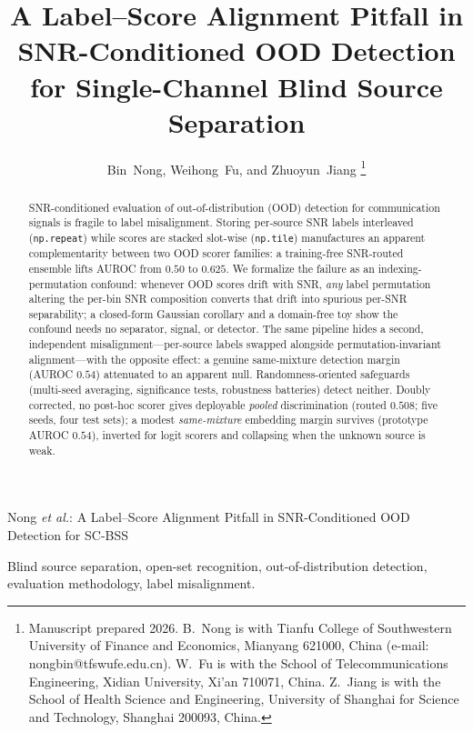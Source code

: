 \documentclass[journal,letterpaper]{IEEEtran}
\begin{document}
\title{A Label--Score Alignment Pitfall in SNR-Conditioned OOD
Detection for Single-Channel Blind Source Separation}

\author{Bin~Nong, Weihong~Fu, and Zhuoyun~Jiang%
\thanks{Manuscript prepared 2026. B.~Nong is with Tianfu College of
Southwestern University of Finance and Economics, Mianyang 621000, China
(e-mail: nongbin@tfswufe.edu.cn). W.~Fu is with the School of
Telecommunications Engineering, Xidian University, Xi'an 710071, China.
Z.~Jiang is with the School of Health Science and Engineering,
University of Shanghai for Science and Technology, Shanghai 200093,
China.}}

%
{Nong \MakeLowercase{\textit{et al.}}: A Label--Score Alignment
Pitfall in SNR-Conditioned OOD Detection for SC-BSS}

\maketitle

\begin{abstract}
SNR-conditioned evaluation of out-of-distribution (OOD) detection for
communication signals is fragile to label misalignment. Storing
per-source SNR labels interleaved (\texttt{np.repeat}) while scores are
stacked slot-wise (\texttt{np.tile}) manufactures an apparent
complementarity between two OOD scorer families: a training-free
SNR-routed ensemble lifts AUROC from $0.50$ to $0.625$. We formalize
the failure as an indexing-permutation confound: whenever OOD scores
drift with SNR, \emph{any} label permutation altering the per-bin SNR
composition converts that drift into spurious per-SNR separability; a
closed-form Gaussian corollary and a domain-free toy show the confound
needs no separator, signal, or detector. The same pipeline hides a
second, independent misalignment---per-source labels swapped alongside
permutation-invariant alignment---with the opposite effect: a genuine
same-mixture detection margin (AUROC $0.54$) attenuated to an apparent
null. Randomness-oriented safeguards (multi-seed averaging,
significance tests, robustness batteries) detect neither. Doubly
corrected, no post-hoc scorer gives deployable \emph{pooled}
discrimination (routed $0.508$; five seeds, four test sets); a modest
\emph{same-mixture} embedding margin survives (prototype AUROC $0.54$),
inverted for logit scorers and collapsing when the unknown source is
weak.
\end{abstract}

\begin{IEEEkeywords}
Blind source separation, open-set recognition, out-of-distribution
detection, evaluation methodology, label misalignment.
\end{IEEEkeywords}
\end{document}
